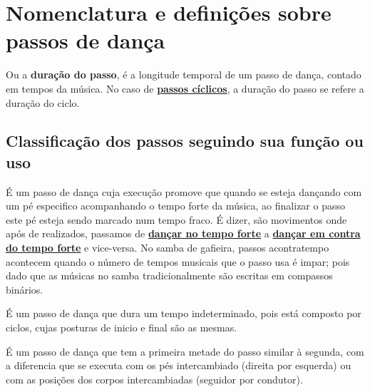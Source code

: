 
\section{Nomenclatura e definições sobre passos de dança}



\begin{definition} 
\label{def:DuracaoDoPasso}
Ou a \textbf{duração do passo}, 
é a longitude temporal de um passo de dança, contado em tempos da música.
No caso de \hyperref[def:PassoCiclico]{\textbf{passos cíclicos}}, a duração do passo se refere a duração do ciclo.
\end{definition}

\subsection{Classificação dos passos seguindo sua função ou uso}

\begin{definition} 
\label{def:PassoAContratempo}
É um passo de dança cuja execução promove que quando se esteja dançando com um pé especifico acompanhando o tempo forte da música,
ao finalizar o passo este pé esteja sendo marcado num tempo fraco.
É dizer, são movimentos onde após de realizados, 
passamos de \hyperref[def:DancaNoTempo]{\textbf{dançar no tempo forte}} a 
\hyperref[def:DancaNoContratempo]{\textbf{dançar em contra do tempo forte}} e vice-versa. 
No samba de gafieira, 
passos acontratempo acontecem quando o número de tempos musicais que o passo usa é impar;
pois dado que as músicas no samba tradicionalmente são escritas em compassos binários. 
\end{definition}


\begin{definition} 
\label{def:PassoCiclico}
É um passo de dança que dura um tempo indeterminado,
pois está composto por ciclos, cujas posturas de inicio e final são as mesmas.
\end{definition}

\begin{definition} 
\label{def:PassoSimetrico}
É um passo de dança que tem a primeira metade do passo similar à segunda,
com a diferencia que se executa com os pés intercambiado (direita por esquerda)
ou com as posições dos corpos intercambiadas (seguidor por condutor).
\end{definition}

